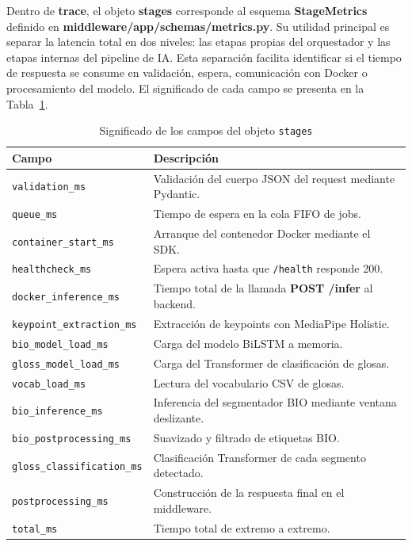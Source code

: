 Dentro de \textbf{trace}, el objeto \textbf{stages} corresponde al esquema \textbf{StageMetrics} definido en \textbf{middleware/app/schemas/metrics.py}. Su utilidad principal es separar la latencia total en dos niveles: las etapas propias del orquestador y las etapas internas del pipeline de IA. Esta separación facilita identificar si el tiempo de respuesta se consume en validación, espera, comunicación con Docker o procesamiento del modelo. El significado de cada campo se presenta en la Tabla~\ref{tab:stages_campos}.

\begin{table}[H]
\centering
\caption{Significado de los campos del objeto \texttt{stages}}
\label{tab:stages_campos}
\scriptsize
\renewcommand{\arraystretch}{1.08}
\setlength{\tabcolsep}{4pt}

\begin{tabular}{
    >{\raggedright\arraybackslash}p{4.8cm}
    >{\raggedright\arraybackslash}p{8.2cm}
}
\toprule
\textbf{Campo} & \textbf{Descripción} \\
\midrule
\texttt{validation\_ms} & Validación del cuerpo JSON del request mediante Pydantic. \\
\texttt{queue\_ms} & Tiempo de espera en la cola FIFO de jobs. \\
\texttt{container\_start\_ms} & Arranque del contenedor Docker mediante el SDK. \\
\texttt{healthcheck\_ms} & Espera activa hasta que \texttt{/health} responde 200. \\
\texttt{docker\_inference\_ms} & Tiempo total de la llamada \textbf{POST /infer} al backend. \\
\texttt{keypoint\_extraction\_ms} & Extracción de keypoints con MediaPipe Holistic. \\
\texttt{bio\_model\_load\_ms} & Carga del modelo BiLSTM a memoria. \\
\texttt{gloss\_model\_load\_ms} & Carga del Transformer de clasificación de glosas. \\
\texttt{vocab\_load\_ms} & Lectura del vocabulario CSV de glosas. \\
\texttt{bio\_inference\_ms} & Inferencia del segmentador BIO mediante ventana deslizante. \\
\texttt{bio\_postprocessing\_ms} & Suavizado y filtrado de etiquetas BIO. \\
\texttt{gloss\_classification\_ms} & Clasificación Transformer de cada segmento detectado. \\
\texttt{postprocessing\_ms} & Construcción de la respuesta final en el middleware. \\
\texttt{total\_ms} & Tiempo total de extremo a extremo. \\
\bottomrule
\end{tabular}
\end{table}

